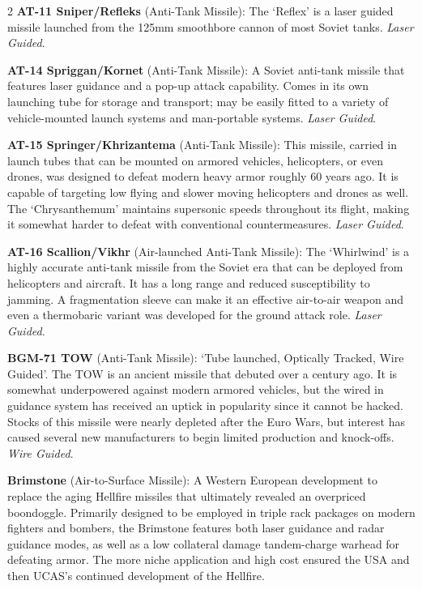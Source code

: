 \documentclass[
  oneside]{article}
\begin{document}
\begin{multicols}{2}
\textbf{AT-11 Sniper/Refleks} (Anti-Tank Missile):
The `Reflex' is a laser guided missile launched
from the 125mm smoothbore cannon of most Soviet
tanks. \emph{Laser Guided}.

\textbf{AT-14 Spriggan/Kornet} (Anti-Tank
Missile): A Soviet anti-tank missile that features
laser guidance and a pop-up attack capability.
Comes in its own launching tube for storage and
transport; may be easily fitted to a variety of
vehicle-mounted launch systems and man-portable
systems. \emph{Laser Guided}.

\textbf{AT-15 Springer/Khrizantema} (Anti-Tank
Missile): This missile, carried in launch tubes
that can be mounted on armored vehicles,
helicopters, or even drones, was designed to
defeat modern heavy armor roughly 60 years ago. It
is capable of targeting low flying and slower
moving helicopters and drones as well. The
`Chrysanthemum' maintains supersonic speeds
throughout its flight, making it somewhat harder
to defeat with conventional countermeasures.
\emph{Laser Guided}.

\textbf{AT-16 Scallion/Vikhr} (Air-launched
Anti-Tank Missile): The `Whirlwind' is a highly
accurate anti-tank missile from the Soviet era
that can be deployed from helicopters and
aircraft. It has a long range and reduced
susceptibility to jamming. A fragmentation sleeve
can make it an effective air-to-air weapon and
even a thermobaric variant was developed for the
ground attack role. \emph{Laser Guided}.

\textbf{BGM-71 TOW} (Anti-Tank Missile): `Tube
launched, Optically Tracked, Wire Guided'. The TOW
is an ancient missile that debuted over a century
ago. It is somewhat underpowered against modern
armored vehicles, but the wired in guidance system
has received an uptick in popularity since it
cannot be hacked. Stocks of this missile were
nearly depleted after the Euro Wars, but interest
has caused several new manufacturers to begin
limited production and knock-offs. \emph{Wire
Guided}.

\textbf{Brimstone} (Air-to-Surface Missile): A
Western European development to replace the aging
Hellfire missiles that ultimately revealed an
overpriced boondoggle. Primarily designed to be
employed in triple rack packages on modern
fighters and bombers, the Brimstone features both
laser guidance and radar guidance modes, as well
as a low collateral damage tandem-charge warhead
for defeating armor. The more niche application
and high cost ensured the USA and then UCAS's
continued development of the Hellfire.


\end{multicols}
\end{document}
